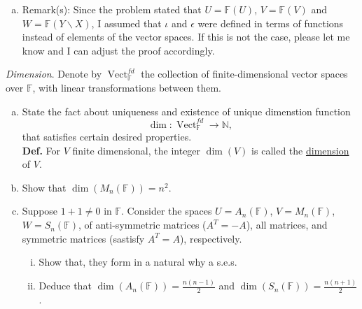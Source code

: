 \documentclass{article}
\begin{document}
\begin{enumerate}[a)]
\begin{enumerate}[i)]
\begin{proof}
            \[
                0 \xrightarrow{} U \xrightarrow{\iota} V \xrightarrow{\epsilon} W \xrightarrow{} 0
            \]
            is a short exact sequence.
        \end{proof}
    \end{enumerate}
    \item[] Remark(s): Since the problem stated that $U = \mathbb{F}(U)$, $V = \mathbb{F}(V)$ and $W = \mathbb{F}(Y \backslash X)$, I assumed that $\iota$ and $\epsilon$ were defined in terms of functions instead of elements of the vector spaces. If this is not the case, please let me know and I can adjust the proof accordingly.
\end{enumerate}


\begin{problem}
    \textit{Dimension}. Denote by $\operatorname{Vect}_{\mathbb{F}}^{fd}$ the collection of finite-dimensional vector spaces over $\mathbb{F}$, with linear transformations between them.
    \begin{enumerate}[a)]
        \item State the fact about uniqueness and existence of unique dimenstion function
        \[
            \dim: \operatorname{Vect}_{\mathbb{F}}^{fd} \to \mathbb{N},
        \]
        that satisfies certain desired properties. \\
        \textbf{Def.} For $V$ finite dimensional, the integer $\dim(V)$ is called the \underline{dimension} of $V$.
        \item Show that $\dim(M_n(\mathbb{F})) = n^2$.
        \item Suppose $1 + 1 \neq 0$ in $\mathbb{F}$. Consider the spaces $U = A_n(\mathbb{F})$, $V = M_n(\mathbb{F})$, $W = S_n(\mathbb{F})$, of anti-symmetric matrices ($A^T = -A$), all matrices, and symmetric matrices (sastisfy $A^T = A$), respectively. 
        \begin{enumerate}[i)]
            \item Show that, they form in a natural why a s.e.s.
            \item Deduce that $\dim(A_n(\mathbb{F})) = \frac{n(n-1)}{2}$ and $\dim(S_n(\mathbb{F})) = \frac{n(n+1)}{2}$.
        \end{enumerate}
    \end{enumerate}
\end{problem}
\end{document}
